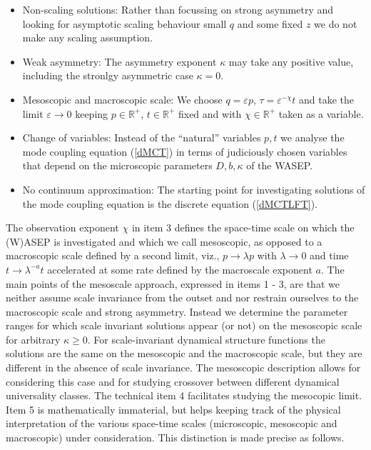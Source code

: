 \documentclass[12pt]{article}
\newcommand{\R}{{\mathbb R}}
\begin{document}
\begin{itemize}
\item[1)] Non-scaling solutions: Rather than focussing on strong asymmetry and looking for asymptotic scaling behaviour small 
$q$ and some fixed $z$ we do not make any scaling assumption.

\item[2)] Weak asymmetry: The asymmetry exponent $\kappa$
may take any positive value, including the stronlgy asymmetric case $\kappa=0$.

\item[3)] Mesoscopic and macroscopic scale:  We choose $q 
= \varepsilon p$, $\tau = \varepsilon^{-\chi} t$ and take the limit 
$\varepsilon \to 0$ keeping $p\in\R^+$, $t\in\R^+$ fixed and with
$\chi\in\R^+$ taken as a variable.

\item[4)] Change of variables: Instead of the ``natural''
variables $p,t$ we analyse the mode coupling equation (\ref{dMCT}) 
in terms of judiciously chosen variables that depend on the microscopic 
parameters $D,b,\kappa$ of the WASEP.

\item[5)] No continuum approximation: The starting point for 
investigating solutions of the mode coupling equation is the 
discrete equation (\ref{dMCTLFT}).
\end{itemize}

The observation exponent $\chi$ in item 3
defines the space-time scale on which the (W)ASEP is investigated and 
which we call mesoscopic, as opposed to a macroscopic scale defined 
by a second limit, viz., $p\to \lambda p$ with $\lambda\to 0$ and time 
$t \to \lambda^{-a} t$ accelerated at some rate defined by the 
macroscale exponent $a$. The main points of the mesoscale approach, expressed in items 1 - 3, 
are that we neither assume scale invariance from the outset and nor 
restrain ourselves to the macroscopic scale and strong asymmetry. 
Instead we determine the parameter ranges 
for which scale invariant solutions appear (or not) on the mesoscopic 
scale for arbitrary $\kappa\geq0$. For scale-invariant dynamical structure functions the solutions 
are the same on the mesoscopic and the macroscopic scale, but they 
are different in the absence of scale invariance. The mesoscopic 
description allows for considering this case and for studying 
crossover between different dynamical universality classes. 
The technical item 4 facilitates studying the mesocopic limit.
Item 5 is mathematically immaterial, but helps keeping track of 
the physical interpretation of the various space-time scales 
(microscopic, mesoscopic and macroscopic) under consideration.
This distinction is made precise as follows.
\end{document}
